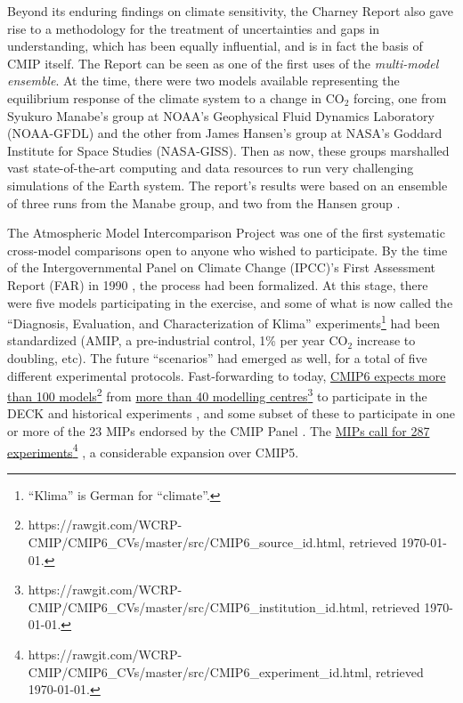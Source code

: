 \documentclass[gmd,manuscript]{copernicus}
\begin{document}
Beyond its enduring findings on climate sensitivity, the Charney
Report also gave rise to a methodology for the treatment of
uncertainties and gaps in understanding, which has been equally
influential, and is in fact the basis of CMIP itself. The Report can
be seen as one of the first uses of the \emph{multi-model ensemble}.
At the time, there were two models available representing the
equilibrium response of the climate system to a change in CO$_2$
forcing, one from Syukuro Manabe's group at NOAA's Geophysical Fluid
Dynamics Laboratory (NOAA-GFDL) and the other from James Hansen's
group at NASA's Goddard Institute for Space Studies (NASA-GISS). Then
as now, these groups marshalled vast state-of-the-art computing and
data resources to run very challenging simulations of the Earth
system. The report's results were based on an ensemble of three runs
from the Manabe group, \citep[see e.g.][]{ref:manabewetherald1975} and
two from the Hansen group \citep[see e.g..][]{ref:hansenetal1981}.

The Atmospheric Model Intercomparison Project
\citep[AMIP:][]{ref:gates1992} was one of the first systematic
cross-model comparisons open to anyone who wished to participate. By
the time of the Intergovernmental Panel on Climate Change (IPCC)'s
First Assessment Report (FAR) in 1990 \citep{ref:houghtonetal1992},
the process had been formalized. At this stage, there were five models
participating in the exercise, and some of what is now called the
``Diagnosis, Evaluation, and Characterization of Klima'' \citep[DECK,
see][]{ref:eyringetal2016a} experiments\footnote{``Klima'' is German
  for ``climate''.} had been standardized (AMIP, a pre-industrial
control, 1\% per year CO$_2$ increase to doubling, etc). The future
``scenarios'' had emerged as well, for a total of five different
experimental protocols. Fast-forwarding to today,
\href{https://rawgit.com/WCRP-CMIP/CMIP6_CVs/master/src/CMIP6_source_id.html}{CMIP6
  expects more than 100
  models}\footnote{https://rawgit.com/WCRP-CMIP/CMIP6\_CVs/master/src/CMIP6\_source\_id.html,
  retrieved \today.} from
\href{https://rawgit.com/WCRP-CMIP/CMIP6_CVs/master/src/CMIP6_institution_id.html}{more
  than 40 modelling
  centres}\footnote{https://rawgit.com/WCRP-CMIP/CMIP6\_CVs/master/src/CMIP6\_institution\_id.html,
  retrieved \today.} \citep[in 27 countries, a stark contrast to the
US monopoly in][]{ref:charneyetal1979} to participate in the DECK and
historical experiments \citep[Table~2 of][]{ref:eyringetal2016a}, and
some subset of these to participate in one or more of the 23 MIPs
endorsed by the CMIP Panel \citep[Table~3 of][, originally 21 with two
new MIPs more recently endorsed]{ref:eyringetal2016a}. The
\href{https://rawgit.com/WCRP-CMIP/CMIP6_CVs/master/src/CMIP6_experiment_id.html}{MIPs
  call for 287
  experiments}\footnote{https://rawgit.com/WCRP-CMIP/CMIP6\_CVs/master/src/CMIP6\_experiment\_id.html,
  retrieved \today.} , a considerable expansion over CMIP5.
\end{document}
